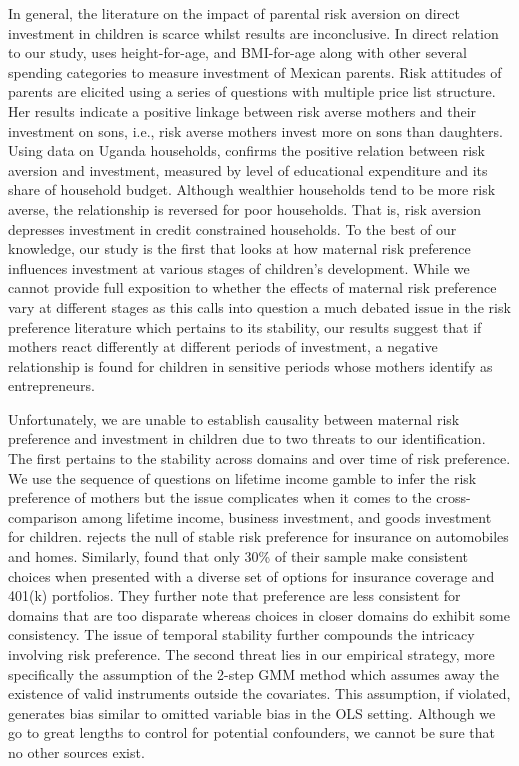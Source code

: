 \documentclass[emulatestandardclasses, 10pt, abstract = true]{scrartcl}
\begin{document}
In general, the literature on the impact of parental risk aversion on direct investment in children is scarce whilst results are inconclusive. In direct relation to our study, \citet{sovero2018risk} uses height-for-age, and BMI-for-age along with other several spending categories to measure investment of Mexican parents. Risk attitudes of parents are elicited using a series of questions with multiple price list structure. Her results indicate a positive linkage between risk averse mothers and their investment on sons, i.e., risk averse mothers invest more on sons than daughters. Using data on Uganda households, \citet{tabetando2019parental} confirms the positive relation between risk aversion and investment, measured by level of educational expenditure and its share of household budget. Although wealthier households tend to be more risk averse, the relationship is reversed for poor households. That is, risk aversion depresses investment in credit constrained households. To the best of our knowledge, our study is the first that looks at how maternal risk preference influences investment at various stages of children's development. While we cannot provide full exposition to whether the effects of maternal risk preference vary at different stages as this calls into question a much debated issue in the risk preference literature which pertains to its stability, our results suggest that if mothers react differently at different periods of investment, a negative relationship is found for children in sensitive periods whose mothers identify as entrepreneurs. 

Unfortunately, we are unable to establish causality between maternal risk preference and investment in children due to two threats to our identification. The first pertains to the stability across domains and over time of risk preference. We use the sequence of questions on lifetime income gamble to infer the risk preference of mothers but the issue complicates when it comes to the cross-comparison among lifetime income, business investment, and goods investment for children.  \citet{barseghyan2011risk} rejects the null of stable risk preference for insurance on automobiles and homes. Similarly, \citet{einav2012general} found that only 30\% of their sample make consistent choices when presented with a diverse set of options for insurance coverage and 401(k) portfolios. They further note that preference are less consistent for domains that are too disparate whereas choices in closer domains do exhibit some consistency. The issue of temporal stability further compounds the intricacy involving risk preference. The second threat lies in our empirical strategy, more specifically the assumption of the 2-step GMM method which assumes away the existence of valid instruments outside the covariates. This assumption, if violated, generates bias similar to omitted variable bias in the OLS setting. Although we go to great lengths to control for potential confounders, we cannot be sure that no other sources exist.
\end{document}
